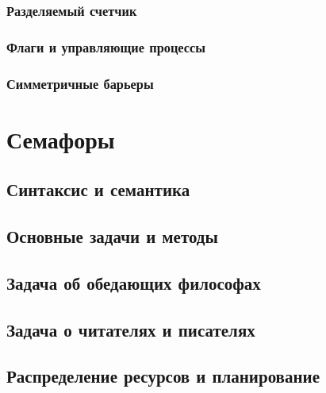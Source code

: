 \subsubsection{Разделяемый счетчик}

\subsubsection{Флаги и управляющие процессы}

\subsubsection{Симметричные барьеры}



\section{Семафоры}

\subsection{Синтаксис и семантика}

\subsection{Основные задачи и методы}

\subsection{Задача об обедающих философах}

\subsection{Задача о читателях и писателях}

\subsection{Распределение ресурсов и планирование}




\lstset{language=C, extendedchars=true, showspaces=false}